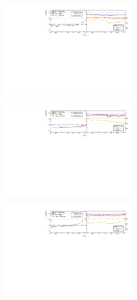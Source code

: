 \begin{figure}[htb]
    \centering 
    \begin{subfigure}{.99\textwidth}\centering
        \includegraphics[width = 0.75\textwidth]{Figures/m4l/UnfoldingStudies/v014_inputs/deltaPhiPairs_m4l60-100inputs.pdf}
    \end{subfigure}
    \begin{subfigure}{.99\textwidth}\centering
        \includegraphics[width = 0.75\textwidth]{Figures/m4l/UnfoldingStudies/v014_inputs/deltaPhiPairs_m4l120-130inputs.pdf}
    \end{subfigure}
    \begin{subfigure}{.99\textwidth}\centering
        \includegraphics[width = 0.75\textwidth]{Figures/m4l/UnfoldingStudies/v014_inputs/deltaPhiPairs_m4l180-2000inputs.pdf}

\end{subfigure}
\end{figure}
